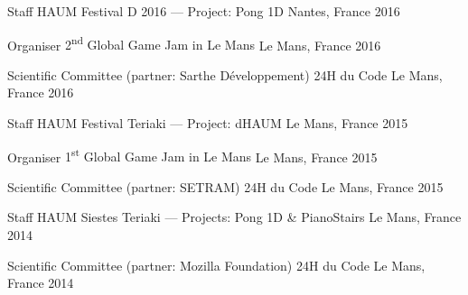 

\begin{cvhonors}

  \cvhonor
		{Staff HAUM} %
		{Festival D 2016 --- Project: Pong 1D} %
    {Nantes, France} %
    {2016} %

  \cvhonor
    {Organiser} %
		{2\textsuperscript{nd} Global Game Jam in Le Mans} %
    {Le Mans, France} %
    {2016} %

  \cvhonor
		{Scientific Committee (partner: Sarthe Développement)} %
    {24H du Code} %
		{Le Mans, France} %
    {2016} %

  \cvhonor
		{Staff HAUM} %
    {Festival Teriaki --- Project: dHAUM} %
		{Le Mans, France} %
    {2015} %

  \cvhonor
    {Organiser} %
		{1\textsuperscript{st} Global Game Jam in Le Mans} %
    {Le Mans, France} %
    {2015} %

  \cvhonor
		{Scientific Committee (partner: SETRAM)} %
    {24H du Code} %
		{Le Mans, France} %
    {2015} %

  \cvhonor
		{Staff HAUM} %
		{Siestes Teriaki --- Projects: Pong 1D \& PianoStairs} %
		{Le Mans, France} %
    {2014} %

  \cvhonor
		{Scientific Committee (partner: Mozilla Foundation)} %
    {24H du Code} %
		{Le Mans, France} %
    {2014} %

\end{cvhonors}
